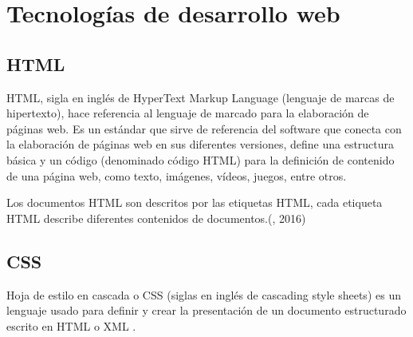 		



		
		




\section{Tecnologías de desarrollo web}

\subsection{HTML}

\setlength{\parskip}{5mm}

HTML, sigla en inglés de HyperText Markup Language (lenguaje de marcas de hipertexto), hace referencia al lenguaje de marcado para la elaboración de páginas web. Es un estándar que sirve de referencia del software que conecta con la elaboración de páginas web en sus diferentes versiones, define una estructura básica y un código (denominado código HTML) para la definición de contenido de una página web, como texto, imágenes, vídeos, juegos, entre otros. 

Los documentos HTML son descritos por las etiquetas HTML, cada etiqueta HTML describe diferentes contenidos de documentos.(\citet{htmlbib}, 2016)

\setlength{\parskip}{0mm}

\subsection{CSS}
\setlength{\parskip}{5mm}
Hoja de estilo en cascada o CSS (siglas en inglés de cascading style sheets) es un lenguaje usado para definir y crear la presentación de un documento estructurado escrito en HTML o XML . 

